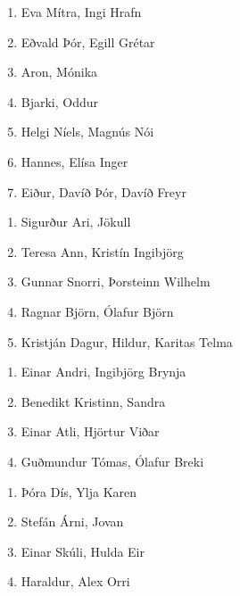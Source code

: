 \begin{multicols}{2}
\begin{enumerate}[label = \textbf{Mán \arabic*:}]
    \item Eva Mítra, Ingi Hrafn
    \item Eðvald Þór, Egill Grétar
    \item Aron, Mónika
    \item Bjarki, Oddur
    \item Helgi Níels, Magnús Nói
    \item Hannes, Elísa Inger
    \item Eiður, Davíð Þór, Davíð Freyr \columnbreak
\end{enumerate}

\begin{enumerate}[label = \textbf{Fös \arabic*:}]
    \item Sigurður Ari, Jökull
    \item Teresa Ann, Kristín Ingibjörg
    \item Gunnar Snorri, Þorsteinn Wilhelm
    \item Ragnar Björn, Ólafur Björn
    \item Kristján Dagur, Hildur, Karitas Telma
\end{enumerate}
\end{multicols}

\vspace{0.5cm}

\begin{multicols}{2}
\begin{enumerate}[label = \textbf{Þri \arabic*:}]
    \item Einar Andri, Ingibjörg Brynja
    \item Benedikt Kristinn, Sandra
    \item Einar Atli, Hjörtur Viðar
    \item Guðmundur Tómas, Ólafur Breki \columnbreak
\end{enumerate}

\begin{enumerate}[label = \textbf{Fim \arabic*:}]
    \item Þóra Dís, Ylja Karen
    \item Stefán Árni, Jovan
    \item Einar Skúli, Hulda Eir
    \item Haraldur, Alex Orri
\end{enumerate}
\end{multicols}

\hspace{0.5cm}

